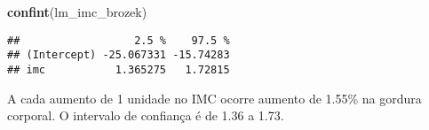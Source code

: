 \documentclass[]{article}
\newenvironment{Shaded}{\begin{snugshade}}{\end{snugshade}}
\newcommand{\KeywordTok}[1]{\textcolor[rgb]{0.13,0.29,0.53}{\textbf{#1}}}
\newcommand{\NormalTok}[1]{#1}
\begin{document}
\begin{Shaded}
\begin{Highlighting}[]
\KeywordTok{confint}\NormalTok{(lm_imc_brozek)}
\end{Highlighting}
\end{Shaded}

\begin{verbatim}
##                  2.5 %    97.5 %
## (Intercept) -25.067331 -15.74283
## imc           1.365275   1.72815
\end{verbatim}

A cada aumento de 1 unidade no IMC ocorre aumento de 1.55\% na gordura
corporal. O intervalo de confiança é de 1.36 a 1.73.
\end{document}

